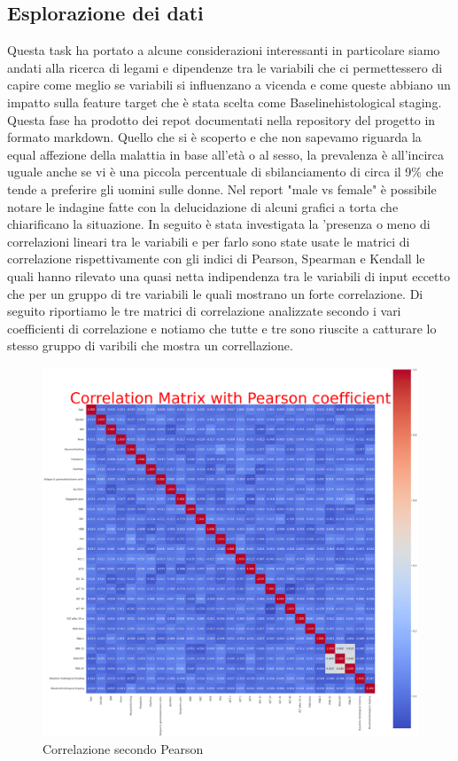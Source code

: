 \documentclass[italian,12pt,a4paper]{article}
\begin{document}
	\subsection{Esplorazione dei dati}
    Questa task ha portato a alcune considerazioni interessanti in particolare siamo andati alla ricerca di legami e dipendenze tra le variabili che ci permettessero di capire come meglio se variabili si influenzano a vicenda e come queste abbiano un impatto sulla feature target che è stata scelta come Baselinehistological staging. Questa fase ha prodotto dei repot documentati nella repository del progetto in formato markdown. Quello che si è scoperto e che non sapevamo riguarda la equal affezione della malattia in base all'età o al sesso, la prevalenza è all'incirca uguale anche se vi è una piccola percentuale di sbilanciamento di circa il 9\% che tende a preferire gli uomini sulle donne. Nel report "male vs female" è possibile notare le indagine fatte con la delucidazione di alcuni grafici a torta che chiarificano la situazione. In seguito è stata investigata la 'presenza o meno di correlazioni lineari tra le variabili e per farlo sono state usate le matrici di correlazione rispettivamente con gli indici di Pearson, Spearman e Kendall le quali hanno rilevato una quasi netta indipendenza tra le variabili di input eccetto che per un gruppo di tre variabili le quali mostrano un forte correlazione. Di seguito riportiamo le tre matrici di correlazione analizzate secondo i vari coefficienti di correlazione e notiamo che tutte e tre sono riuscite a catturare lo stesso gruppo di varibili che mostra un correllazione.

    \begin{figure}[htbp]
        \centering
		\includegraphics[width=1\textwidth]{corrMatirxPearson.png}
         \caption{Correlazione secondo Pearson}
         \label{fig:PeraonMatrix}
	\end{figure}
\end{document}
